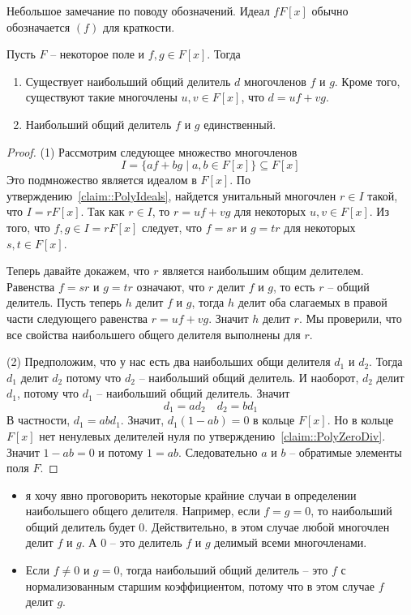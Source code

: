 Небольшое замечание по поводу обозначений.
Идеал $fF[x]$ обычно обозначается $(f)$ для краткости.

\begin{claim}
\label{claim::PolyGCD}
Пусть $F$ -- некоторое поле и $f,g\in F[x]$.
Тогда
\begin{enumerate}
\item Существует наибольший общий делитель $d$ многочленов $f$ и $g$.
Кроме того, существуют такие многочлены $u,v\in F[x]$, что $d = uf + v g$.

\item Наибольший общий делитель $f$ и $g$ единственный.
\end{enumerate}
\end{claim}
\begin{proof}
(1) Рассмотрим следующее множество многочленов
\[
I = \{a f + b g \mid a, b \in F[x]\}\subseteq F[x]
\]
Это подмножество является идеалом в $F[x]$.
По утверждению~\ref{claim::PolyIdeals}, найдется унитальный многочлен $r\in I$ такой, что $I = r F[x]$.
Так как $r\in I$, то $r = uf + vg$ для некоторых $u, v\in F[x]$.
Из того, что $f, g \in I = r F[x]$ следует, что $f = s r$ и $g = t r$ для некоторых $s, t \in F[x]$.

Теперь давайте докажем, что $r$ является наибольшим общим делителем.
Равенства $f = s r$ и $g = t r$ означают, что $r$ делит $f$ и $g$, то есть $r$ -- общий делитель.
Пусть теперь $h$ делит $f$ и $g$, тогда $h$ делит оба слагаемых в правой части следующего равенства $r = uf + vg$.
Значит $h$ делит $r$.
Мы проверили, что все свойства наибольшего общего делителя выполнены для $r$.


(2) Предположим, что у нас есть два наибольших общи делителя $d_1$ и $d_2$.
Тогда $d_1$ делит $d_2$ потому что $d_2$ -- наибольший общий делитель.
И наоборот, $d_2$ делит $d_1$, потому что $d_1$ -- наибольший общий делитель.
Значит
\[
d_1 = a d_2\quad d_2 = b d_1
\]
В частности, $d_1 = ab d_1$.
Значит, $d_1(1 - ab)= 0$ в кольце $F[x]$.
Но в кольце $F[x]$ нет ненулевых делителей нуля по утверждению~\ref{claim::PolyZeroDiv}.
Значит $1 - ab = 0$ и потому $1 = ab$.
Следовательно $a$ и $b$ -- обратимые элементы поля $F$.
\end{proof}

\begin{remarks}
\begin{itemize}
\item я хочу явно проговорить некоторые крайние случаи в определении наибольшего общего делителя.
Например, если $f = g = 0$, то наибольший общий делитель будет $0$.
Действительно, в этом случае любой многочлен делит $f$ и $g$.
А $0$ -- это делитель $f$ и $g$ делимый всеми многочленами.

\item Если $f \neq 0$ и $g = 0$, тогда наибольший общий делитель -- это $f$ с нормализованным старшим коэффициентом, потому что в этом случае $f$ делит $g$.
\end{itemize}
\end{remarks}


